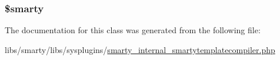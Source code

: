 \subsubsection[{\$smarty}]{\setlength{\rightskip}{0pt plus 5cm}\$smarty}\label{class_smarty___internal___smarty_template_compiler_ac3ae29e9ccbb2006fa26fd9eb2c12117}


The documentation for this class was generated from the following file\+:\begin{DoxyCompactItemize}
\item 
libs/smarty/libs/sysplugins/\hyperlink{smarty__internal__smartytemplatecompiler_8php}{smarty\+\_\+internal\+\_\+smartytemplatecompiler.\+php}\end{DoxyCompactItemize}
